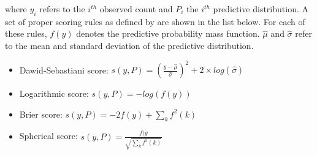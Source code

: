 where $y_{i}$ refers to the $i^{th}$ observed count and $P_{i}$ the $i^{th}$ predictive distribution. A set of proper scoring rules as defined by \citet{czado:etal:2009} are shown in the list below. For each of these rules, $f(y)$ denotes the predictive probability mass function. $\hat\mu$ and $\hat\sigma$ refer to the mean and standard deviation of the predictive distribution. 

\begin{itemize}
	\item Dawid-Sebastiani score: $s(y,P) = (\frac{y-\hat\mu}{\hat\sigma})^{2} + 2 \times log(\hat\sigma)$
	\item Logarithmic score: $s(y,P) = -log(f(y))$
	\item Brier score:  $s(y,P) = -2f(y) + \sum_{k}f^{2}(k)$ 	
	\item Spherical score: $s(y,P) = \frac{f(y}{\sqrt{\sum_{k}f^{2}(k)}}$
\end{itemize}

